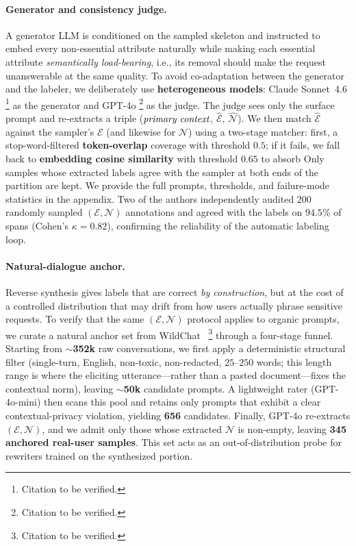 \paragraph{Generator and consistency judge.}
A generator LLM is conditioned on the sampled skeleton and instructed
to embed every non-essential attribute naturally while making each
essential attribute \emph{semantically load-bearing}, i.e., its
removal should make the request unanswerable at the same quality. To
avoid co-adaptation between the generator and the labeler, we
deliberately use \textbf{heterogeneous models}: Claude Sonnet~4.6%
\footnote{Citation to be verified.}
as the generator and GPT-4o%
\footnote{Citation to be verified.}
as the judge. The judge sees only the surface prompt and re-extracts
a triple ($\emph{primary context}$, $\hat{\mathcal{E}}$,
$\hat{\mathcal{N}}$). We then match $\hat{\mathcal{E}}$ against the
sampler's $\mathcal{E}$ (and likewise for $\mathcal{N}$) using a
two-stage matcher: first, a stop-word-filtered \textbf{token-overlap}
coverage with threshold $0.5$; if it fails, we fall back to
\textbf{embedding cosine similarity} with threshold $0.65$ to absorb
Only samples whose extracted labels agree with
the sampler at both ends of the partition are kept. We provide the
full prompts, thresholds, and failure-mode statistics in the
appendix. Two of the authors independently audited 200 randomly sampled
$(\mathcal{E},\mathcal{N})$ annotations and agreed with the
labels on $94.5\%$ of spans (Cohen's $\kappa = 0.82$), confirming the reliability of the
automatic labeling loop. 

\paragraph{Natural-dialogue anchor.}
Reverse synthesis gives labels that are correct \emph{by
construction}, but at the cost of a controlled distribution that may
drift from how users actually phrase sensitive requests. To verify
that the same $(\mathcal{E},\mathcal{N})$ protocol applies to
organic prompts, we curate a natural anchor set from
WildChat~\citep{zhao2024wildchat}%
\footnote{Citation to be verified.}
through a four-stage funnel. Starting from
\textbf{$\sim$352k} raw conversations, we first apply a
deterministic structural filter (single-turn, English, non-toxic,
non-redacted, $25$--$250$ words; this length range is where the
eliciting utterance---rather than a pasted document---fixes the
contextual norm), leaving \textbf{$\sim$50k} candidate prompts.
A lightweight rater (GPT-4o-mini) then scans this pool and retains
only prompts that exhibit a clear contextual-privacy violation,
yielding \textbf{656} candidates. Finally, GPT-4o re-extracts $(\mathcal{E},\mathcal{N})$, and we admit only those whose extracted
$\mathcal{N}$ is non-empty, leaving \textbf{345 anchored real-user
samples}. This set acts as an
out-of-distribution probe for rewriters trained on the synthesized
portion.

